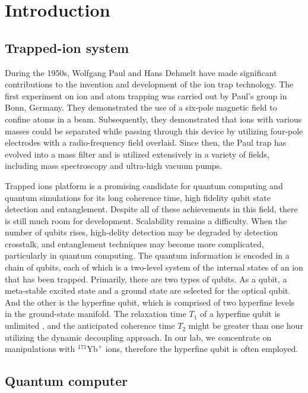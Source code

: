 
\chapter{Introduction}

\section{Trapped-ion system}

During the 1950s, Wolfgang Paul and Hans Dehmelt have made significant contributions to the invention and development of the ion trap technology. The first experiment on ion and atom trapping was carried out by Paul's group in Bonn, Germany. They demonstrated the use of a six-pole magnetic field to confine atoms in a beam. Subsequently, they demonstrated that ions with various masses could be separated while passing through this device by utilizing four-pole electrodes with a radio-frequency field overlaid. Since then, the Paul trap \cite{RevModPhys.62.531} has evolved into a mass filter and is utilized extensively in a variety of fields, including mass spectroscopy and ultra-high vacuum pumps.

Trapped ions platform is a promising candidate for quantum computing and quantum simulations for its long coherence time, high fidelity qubit state detection and entanglement. Despite all of these achievements in this field, there is still much room for development. Scalability remains a difficulty. When the number of qubits rises, high-delity detection may be degraded by detection crosstalk, and entanglement techniques may become more complicated, particularly in quantum computing. The quantum information is encoded in a chain of qubits, each of which is a two-level system of the internal states of an ion that has been trapped. Primarily, there are two types of qubits. As a qubit, a meta-stable excited state and a ground state are selected for the optical qubit. And the other is the hyperfine qubit, which is comprised of two hyperfine levels in the ground-state manifold. The relaxation time $T_1$ of a hyperfine qubit is unlimited , and the anticipated coherence time $T_2$ might be greater than one hour utilizing the dynamic decoupling approach. In our lab, we concentrate on manipulations with ${ }^{171} \mathrm{Yb}^{+}$ ions, therefore the hyperfine qubit is often employed.



\section{Quantum computer}

